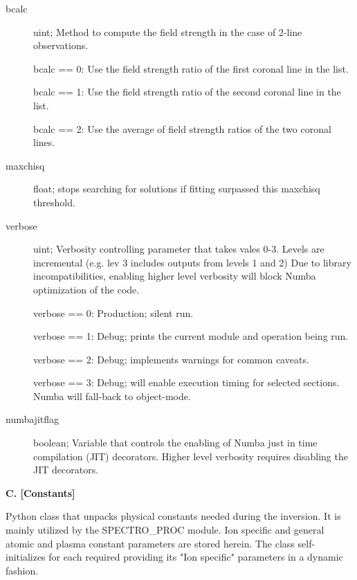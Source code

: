 \documentclass{article}
\begin{document}
\begin{description}
	\item[bcalc]
	uint; Method to compute the field strength in the case of 2-line observations.
	\item[]
	bcalc == 0: Use the field strength ratio of the first coronal line in the list.
	\item[]
	bcalc == 1: Use the field strength ratio of the second coronal line in the list.
	\item[]
	bcalc == 2: Use the average of field strength ratios of the two coronal lines.
	\item[maxchisq]
	float; stops searching for solutions if fitting surpassed this maxchisq threshold.
	\item[verbose]
	uint; Verbosity controlling parameter that takes vales 0-3. Levels are incremental (e.g. lev 3 includes outputs from levels 1 and 2) Due to library incompatibilities, enabling higher level verbosity will block Numba optimization of the code. 
	\item[] 
	verbose == 0: Production; silent run.
	\item[]
	verbose == 1: Debug; prints the current module and operation being run.
	\item[]
	verbose == 2: Debug; implements warnings for common caveats.
	\item[]
	verbose == 3: Debug; will enable execution timing for selected sections. Numba will fall-back to object-mode.
	\item[numbajitflag]
	boolean; Variable that controls the enabling of Numba just in time compilation (JIT) decorators. Higher level verbosity requires disabling the JIT decorators. 
\end{description}


\textbf{C. [Constants]}

        Python class that unpacks physical constants needed during the inversion. It is mainly utilized by the SPECTRO\_PROC module. Ion specific and general atomic and plasma constant parameters are stored herein. The class self-initializes for each required providing its "Ion specific" parameters in a dynamic fashion.
\end{document}
